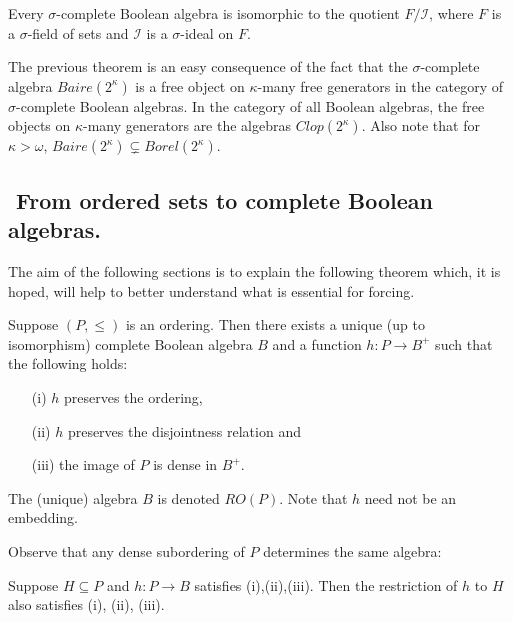 Every $\sigma$-complete Boolean algebra is isomorphic to the quotient $F/{\mathcal I}$,
 where $F$ is a $\sigma$-field of sets and ${\mathcal I}$ is a $\sigma$-ideal on $F$.

\smallskip

The previous theorem is an easy consequence of the fact that the $\sigma$-complete algebra $Baire(2^\kappa)$ is a free object on $\kappa$-many free
generators in the category of $\sigma$-complete Boolean algebras. In the category of all Boolean algebras, the free objects on $\kappa$-many generators
are the algebras $Clop(2^\kappa)$. Also note that for $\kappa>\omega$, $Baire(2^\kappa)\subsetneq Borel(2^\kappa)$.


\subsection{${}$ \hspace{-1em}From ordered sets to complete Boolean algebras.}

The aim of the following sections is to explain the following theorem which, it is hoped, will help to better understand
what is essential for forcing.

\begin{theorem}
 Suppose $(P,\leq)$ is an ordering. Then there exists a unique (up to isomorphism) complete
Boolean algebra $B$ and a function $h:P\to B^{+}$ such that the following holds:
\begin{itemize}
 \item[(i)]    $h$ preserves the ordering,
 \item[(ii)]   $h$ preserves the disjointness relation and
 \item[(iii)]  the image of $P$ is dense in $ B^{+}$.
\end{itemize}
The (unique) algebra $B$ is denoted $RO(P)$. Note that $h$ need not be an embedding.
\end{theorem}

Observe that any dense subordering of $P$ determines the same algebra:

Suppose $H\subseteq P$ and $h:P\to B$ satisfies (i),(ii),(iii). Then the restriction of $h$ to $H$ also satisfies
(i), (ii), (iii).

